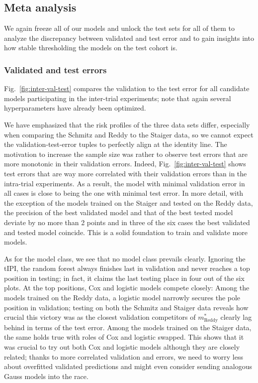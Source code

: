 \subsection{Meta analysis}

We again freeze all of our models and unlock the test sets for all of them to analyze the discrepancy 
between validated and test error and to gain insights into how stable thresholding the models on the 
test cohort is.

\subsubsection{Validated and test errors}



Fig.\ \ref{fig:inter-val-test} compares the validation to the test error for all candidate models 
participating in the inter-trial experiments; note that again several hyperparameters have already 
been optimized. 

We have emphasized that the risk profiles of the three data sets differ, especially when comparing 
the Schmitz and Reddy to the Staiger data, so we cannot expect the validation-test-error tuples 
to perfectly align at the identity line. The motivation to increase the sample size was rather 
to observe test errors that are more monotonic in their validation errors. Indeed, Fig.\ 
\ref{fig:inter-val-test} shows test errors that are way more correlated with their validation errors 
than in the intra-trial experiments. As a result, the model with minimal validation error in all 
cases is close to being the one with minimal test error. In more detail, with the exception of 
the models trained on the Staiger and tested on the Reddy data, the precision of the best 
validated model and that of the best tested model deviate by no more than \num{2} points and in 
three of the six cases the best validated and tested model coincide. This is a solid foundation 
to train and validate more models.

As for the model class, we see that no model class prevails clearly. Ignoring the tIPI, the random 
forest always finishes last in validation and never reaches a top position in testing; in fact, 
it claims the last testing place in four out of the six plots. At the top positions, Cox and 
logistic models compete closely: Among the models trained on the Reddy data, a logistic model 
narrowly secures the pole position in validation; testing on both the Schmitz and Staiger 
data reveals how crucial this victory was as the closest validation competitors of 
$m^*_\text{Reddy}$ clearly lag behind in terms of the test error. Among the models trained on the 
Staiger data, the same holds true with roles of Cox and logistic swapped. This shows that it 
was crucial to try out both Cox and logistic models although they are closely related; thanks to 
more correlated validation and errors, we need to worry less about overfitted validated 
predictions and might even consider sending analogous Gauss models into the race.

